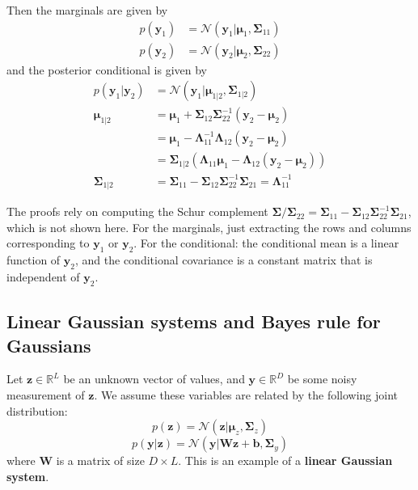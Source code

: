 \documentclass[11pt]{article}
\begin{document}
Then the marginals are given by
\[
\boxed{
\begin{aligned}
p(\boldsymbol{y}_1) &= \mathcal{N}(\boldsymbol{y}_1 | \boldsymbol{\mu}_1, \boldsymbol{\Sigma}_{11}) \\
p(\boldsymbol{y}_2) &= \mathcal{N}(\boldsymbol{y}_2 | \boldsymbol{\mu}_2, \boldsymbol{\Sigma}_{22})
\end{aligned}
}
\]
and the posterior conditional is given by
\[
\boxed{
\begin{aligned}
p(\boldsymbol{y}_1 | \boldsymbol{y}_2) &= \mathcal{N}(\boldsymbol{y}_1 | \boldsymbol{\mu}_{1|2}, \boldsymbol{\Sigma}_{1|2}) \\
\boldsymbol{\mu}_{1|2} &= \boldsymbol{\mu}_1 + \boldsymbol{\Sigma}_{12} \boldsymbol{\Sigma}_{22}^{-1} (\boldsymbol{y}_2 - \boldsymbol{\mu}_2) \\
&= \boldsymbol{\mu}_1 - \boldsymbol{\Lambda}_{11}^{-1} \boldsymbol{\Lambda}_{12} (\boldsymbol{y}_2 - \boldsymbol{\mu}_2) \\
&= \boldsymbol{\Sigma}_{1|2} \left( \boldsymbol{\Lambda}_{11} \boldsymbol{\mu}_1 - \boldsymbol{\Lambda}_{12} (\boldsymbol{y}_2 - \boldsymbol{\mu}_2) \right) \\
\boldsymbol{\Sigma}_{1|2} &= \boldsymbol{\Sigma}_{11} - \boldsymbol{\Sigma}_{12} \boldsymbol{\Sigma}_{22}^{-1} \boldsymbol{\Sigma}_{21} = \boldsymbol{\Lambda}_{11}^{-1}
\end{aligned}
}
\]

The proofs rely on computing the Schur complement $\boldsymbol{\Sigma}/\boldsymbol{\Sigma}_{22} = \boldsymbol{\Sigma}_{11} - \boldsymbol{\Sigma}_{12} \boldsymbol{\Sigma}_{22}^{-1} \boldsymbol{\Sigma}_{21}$, which is not shown here.
For the marginals, just extracting the rows and columns corresponding to $\boldsymbol{y}_1$ or $\boldsymbol{y}_2$. 
For the conditional: the conditional mean is a linear function of $\boldsymbol{y}_2$, and the conditional covariance is a constant matrix that is independent of $\boldsymbol{y}_2$. 

\subsection{Linear Gaussian systems and Bayes rule for Gaussians}
Let $\boldsymbol{z} \in \mathbb{R}^L$ be an unknown vector of values, and $\boldsymbol{y} \in \mathbb{R}^D$ be some noisy measurement of $\boldsymbol{z}$. We assume these variables are related by the following joint distribution:
\[
p(\boldsymbol{z}) = \mathcal{N}(\boldsymbol{z} | \boldsymbol{\mu}_z, \boldsymbol{\Sigma}_z)
\]
\[
p(\boldsymbol{y} | \boldsymbol{z}) = \mathcal{N}(\boldsymbol{y} | \mathbf{W}\boldsymbol{z} + \boldsymbol{b}, \boldsymbol{\Sigma}_y)
\]
where $\mathbf{W}$ is a matrix of size $D \times L$. This is an example of a \textbf{linear Gaussian system}.
\end{document}
